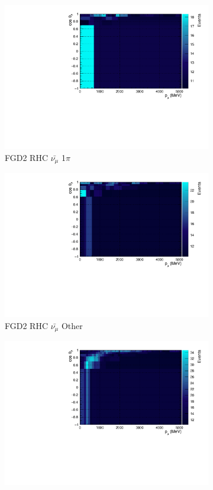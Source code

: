 \begin{figure}
\begin{subfigure}{.32\textwidth}
  \includegraphics[width=0.95\linewidth]{figs/TH2Poly_MC_FGD2_anti-numuCC_1pi}
  \caption{FGD2 RHC $\bar{\nu_{\mu}}$ 1$\pi$}
  \label{fig:th2polyth2polyFGD2_anti-numuCC_1pi}
\end{subfigure}
\begin{subfigure}{.32\textwidth}
  \centering
  \includegraphics[width=0.95\linewidth]{figs/TH2Poly_MC_FGD2_anti-numuCC_other}
  \caption{FGD2 RHC $\bar{\nu_{\mu}}$ Other}
  \label{fig:th2polyFGD2_anti-numuCC_other}
\end{subfigure}
\begin{subfigure}{.32\textwidth}
  \centering
  \includegraphics[width=0.95\linewidth]{figs/TH2Poly_MC_FGD1_NuMuBkg_CC0pi_in_AntiNu_Mode}

\end{subfigure}
\end{figure}
